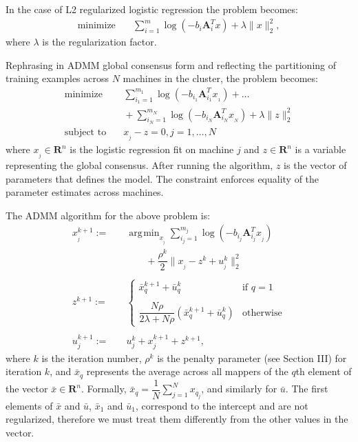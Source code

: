 \documentclass[10pt, conference, compsocconf]{IEEEtran}
\DeclareMathOperator*{\argmin}{arg\!\min}
\begin{document}
In the case of L2 regularized logistic regression the problem becomes:
\begin{align*}
\text{minimize}&\quad \sum_{i=1}^m \log(-b_i\mathbf{A}_i^Tx) + \lambda\|x\|_2^2,
\end{align*}
where $\lambda$ is the regularization factor.

Rephrasing in ADMM global consensus form and reflecting the partitioning of training examples across $N$ machines in the cluster, the problem becomes:
\begin{align*}
\text{minimize}&\quad \sum_{i_1=1}^{m_1} \log(-b_{i_1}\mathbf{A}_{i_1}^Tx_{_1})+\ldots \\
&\quad+\sum_{i_N=1}^{m_N} \log(-b_{i_N}\mathbf{A}_{i_N}^Tx_{_N})+\lambda\|z\|_2^2\\
\text{subject to}&\quad x_{_j} - z = 0, j = 1, \ldots, N
\end{align*}
where $x_{_j}\in\mathbf{R}^n$ is the logistic regression fit on machine $j$ and $z\in\mathbf{R}^n$ is a variable representing the global consensus.  After running the algorithm, $z$ is the vector of parameters that defines the model. The constraint enforces equality of the parameter estimates across machines.

The ADMM algorithm for the above problem is:
\begin{align}
\label{eq:x}
x_{_j}^{k+1} :=&\quad \argmin_{x_{_j}} \sum_{i_j=1}^{m_j} \log(-b_{i_j}\mathbf{A}_{i_j}^Tx_{_j}) \\
&\quad\quad\quad+ \dfrac{\rho^k}{2}\|x_{_j} - z^k + u_{_j}^k\|_2^2 \nonumber\\
\nonumber\\
\label{eq:z}
z^{k+1} :=&\quad \begin{cases}
    \bar{x}_q^{k+1} + \bar{u}_q^k& \text{if $q=1$}\\
    \\
    \dfrac{N\rho}{2\lambda + N\rho}(\bar{x}_q^{k+1} + \bar{u}_q^k)& \text{otherwise}
  \end{cases}\\
\nonumber\\
\label{eq:u}
u_j^{k+1} :=&\quad u_j^k + x_j^{k+1} + z^{k+1},
\end{align}
where $k$ is the iteration number, $\rho^k$ is the penalty parameter (see Section III) for iteration $k$, and $\bar{x}_q$ represents the average across all mappers of the $q$th element of the vector $\bar{x}\in\mathbf{R}^n$.  Formally, $\bar{x}_q = \dfrac{1}{N}\sum_{j=1}^N x_{q_j}$, and similarly for $\bar{u}$.  The first elements of $\bar{x}$ and $\bar{u}$, $\bar{x}_1$ and $\bar{u}_1$, correspond to the intercept and are not regularized, therefore we must treat them differently from the other values in the vector.
\end{document}
